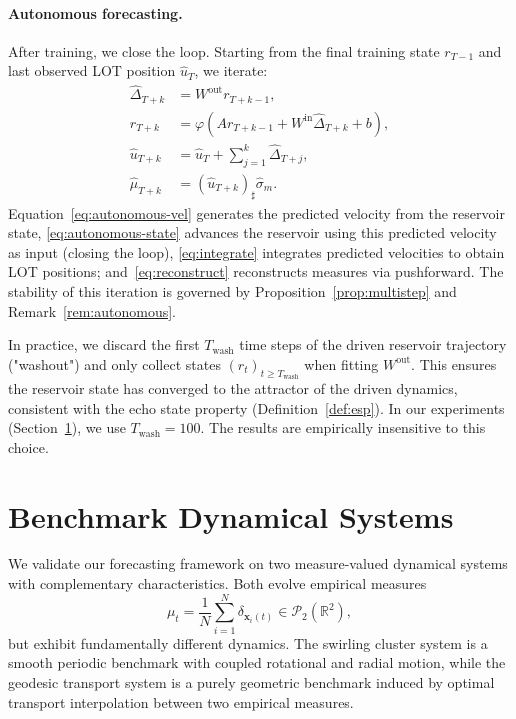 \documentclass[11pt]{article}
\newcommand{\R}{\mathbb{R}}
\newcommand{\1}{\mathbf{1}}
\begin{document}
\paragraph{Autonomous forecasting.}
After training, we close the loop. Starting from the final training state
$r_{T-1}$ and last observed LOT position $\hat{u}_T$, we iterate:
\begin{align}
  \widehat{\Delta}_{T+k}
  &= W^{\mathrm{out}} r_{T+k-1},
  \label{eq:autonomous-vel} \\
  r_{T+k}
  &= \varphi(A r_{T+k-1} + W^{\mathrm{in}} \widehat{\Delta}_{T+k} + b),
  \label{eq:autonomous-state} \\
  \widehat{u}_{T+k}
  &= \hat{u}_T + \sum_{j=1}^k \widehat{\Delta}_{T+j},
  \label{eq:integrate} \\
  \widehat{\mu}_{T+k}
  &= (\widehat{u}_{T+k})_\sharp \hat{\sigma}_m.
  \label{eq:reconstruct}
\end{align}
Equation~\eqref{eq:autonomous-vel} generates the predicted velocity from
the reservoir state, \eqref{eq:autonomous-state} advances the reservoir using this predicted velocity as input (closing the loop), \eqref{eq:integrate} integrates predicted velocities to obtain LOT positions; and~\eqref{eq:reconstruct} reconstructs measures via pushforward. The stability of this iteration is governed by Proposition~\ref{prop:multistep} and Remark~\ref{rem:autonomous}.

\begin{remark}\label{rem:washout}
In practice, we discard the first $T_{\mathrm{wash}}$ time steps of the driven reservoir trajectory ("washout") and only collect states $(r_t)_{t \geq T_{\mathrm{wash}}}$ when fitting $W^{\mathrm{out}}$. This ensures the reservoir state has converged to the attractor of the driven dynamics, consistent with the echo state property (Definition~\ref{def:esp}). In our experiments (Section~\ref{sec:benchmarks}), we use $T_{\mathrm{wash}} = 100$. The results are empirically insensitive to this choice.
\end{remark}

\newpage
\section{Benchmark Dynamical Systems}
\label{sec:benchmarks}

We validate our forecasting framework on two measure-valued dynamical systems with complementary characteristics. Both evolve empirical measures
\[
\mu_t = \frac{1}{N}\sum_{i=1}^N \delta_{\mathbf{x}_i(t)} \in \mathcal{P}_2(\R^2),
\]
but exhibit fundamentally different dynamics. The swirling cluster system is a smooth periodic benchmark with coupled rotational and radial motion, while the geodesic transport system is a purely geometric benchmark induced by optimal transport interpolation between two empirical measures.
\end{document}
